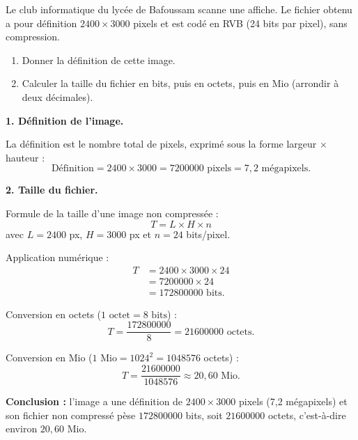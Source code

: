 \documentclass[11pt]{article}
\begin{document}
\begin{exoresolu}
Le club informatique du lycée de Bafoussam scanne une affiche. Le fichier obtenu a pour définition $2400 \times 3000$ pixels et est codé en RVB (24 bits par pixel), sans compression.
\begin{enumerate}
  \item Donner la définition de cette image.
  \item Calculer la taille du fichier en bits, puis en octets, puis en Mio (arrondir à deux décimales).
\end{enumerate}
\tcblower
\textbf{1. Définition de l'image.}

La définition est le nombre total de pixels, exprimé sous la forme largeur $\times$ hauteur :
\[ \text{Définition} = 2400 \times 3000 = \num{7200000} \text{ pixels} = 7,2 \text{ mégapixels.} \]

\textbf{2. Taille du fichier.}

Formule de la taille d'une image non compressée :
\[ T = L \times H \times n \]
avec $L = 2400$ px, $H = 3000$ px et $n = 24$ bits/pixel.

Application numérique :
\begin{align*}
T &= 2400 \times 3000 \times 24 \\
  &= \num{7200000} \times 24 \\
  &= \num{172800000} \text{ bits.}
\end{align*}

Conversion en octets ($1 \text{ octet} = 8 \text{ bits}$) :
\[ T = \frac{\num{172800000}}{8} = \num{21600000} \text{ octets.} \]

Conversion en Mio ($1 \text{ Mio} = 1024^2 = \num{1048576}$ octets) :
\[ T = \frac{\num{21600000}}{\num{1048576}} \approx 20,60 \text{ Mio.} \]

\textbf{Conclusion :} l'image a une définition de $2400 \times 3000$ pixels (7,2 mégapixels) et son fichier non compressé pèse $\num{172800000}$ bits, soit $\num{21600000}$ octets, c'est-à-dire environ $20,60$ Mio.
\end{exoresolu}
\end{document}
